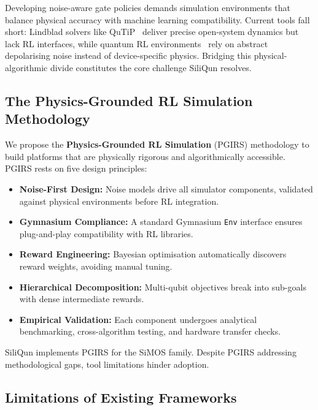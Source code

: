 Developing noise-aware gate policies demands simulation environments that balance physical accuracy with machine learning compatibility. Current tools fall short: Lindblad solvers like QuTiP~\cite{Lambert2024} deliver precise open-system dynamics but lack RL interfaces, while quantum RL environments~\cite{VanDerLinde2023,QiskitGym2024} rely on abstract depolarising noise instead of device-specific physics. Bridging this physical-algorithmic divide constitutes the core challenge SiliQun resolves.

\subsection{The Physics-Grounded RL Simulation Methodology}
\label{subsec:intro_pgirs}

We propose the \textbf{Physics-Grounded RL Simulation} (PGIRS) methodology to build platforms that are physically rigorous and algorithmically accessible. PGIRS rests on five design principles:  

\begin{itemize}
  \item \textbf{Noise-First Design:} Noise models drive all simulator components, validated against physical environments before RL integration.  
  \item \textbf{Gymnasium Compliance:} A standard Gymnasium \texttt{Env} interface ensures plug-and-play compatibility with RL libraries.  
  \item \textbf{Reward Engineering:} Bayesian optimisation automatically discovers reward weights, avoiding manual tuning.  
  \item \textbf{Hierarchical Decomposition:} Multi-qubit objectives break into sub-goals with dense intermediate rewards.  
  \item \textbf{Empirical Validation:} Each component undergoes analytical benchmarking, cross-algorithm testing, and hardware transfer checks.  
\end{itemize}

SiliQun implements PGIRS for the SiMOS family. Despite PGIRS addressing methodological gaps, tool limitations hinder adoption.  

\subsection{Limitations of Existing Frameworks}
\label{subsec:intro_limitations}

